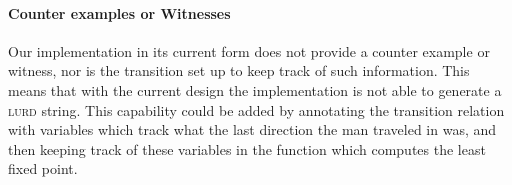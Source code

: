 \paragraph{Counter examples or Witnesses} Our implementation in its current form 
does not provide a counter example or witness, nor is the transition set up to
keep track of such information. This means that with the current design the 
implementation is not able to generate a \textsc{lurd} string. This capability
could be added by annotating the transition relation with variables which track
what the last direction the man traveled in was, and then keeping track of these
variables in the function which computes the least fixed point.
